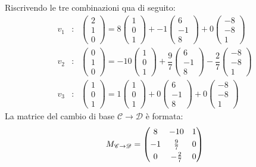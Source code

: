 \documentclass[a4paper]{article}
\makeatletter
\newenvironment{rowequmat}[1]{\left(\array{@{}#1@{}}}{\endarray\right)}
\makeatother
\begin{document}
	\noindent
	Riscrivendo le tre combinazioni qua di seguito:
	\begin{equation*}
		\begin{array}{lll}
			v_{1} &:& \begin{pmatrix}
				2 \\ 1 \\ 0
			\end{pmatrix} =
			8 \begin{pmatrix}
				1 \\ 0 \\ 1
			\end{pmatrix} +
			-1 \begin{pmatrix}
				6 \\ -1 \\ 8
			\end{pmatrix} +
			0 \begin{pmatrix}
				-8 \\ -8 \\ 1
			\end{pmatrix} \\ [1.8em]
			v_{2} &:& \begin{pmatrix}
				0 \\ 1 \\ 0
			\end{pmatrix} =
			-10 \begin{pmatrix}
				1 \\ 0 \\ 1
			\end{pmatrix} +
			\dfrac{9}{7} \begin{pmatrix}
				6 \\ -1 \\ 8
			\end{pmatrix} -
			\dfrac{2}{7} \begin{pmatrix}
				-8 \\ -8 \\ 1
			\end{pmatrix} \\ [1.8em]
			v_{3} &:& \begin{pmatrix}
				1 \\ 0 \\ 1
			\end{pmatrix} =
			1 \begin{pmatrix}
				1 \\ 0 \\ 1
			\end{pmatrix} +
			0 \begin{pmatrix}
				6 \\ -1 \\ 8
			\end{pmatrix} +
			0 \begin{pmatrix}
				-8 \\ -8 \\ 1
			\end{pmatrix}
		\end{array}
	\end{equation*}
	La matrice del cambio di base $\mathscr{C} \rightarrow \mathscr{D}$ è formata:
	\begin{equation*}
		M_{\mathscr{C} \rightarrow \mathscr{D}} = \begin{rowequmat}{ccc}
			8  & -10 			& 1 \\ [0.3em]
			-1 &  \frac{9}{7}  	& 0 \\ [0.3em]
			0  & -\frac{2}{7}   & 0
		\end{rowequmat}
	\end{equation*}
\end{document}
